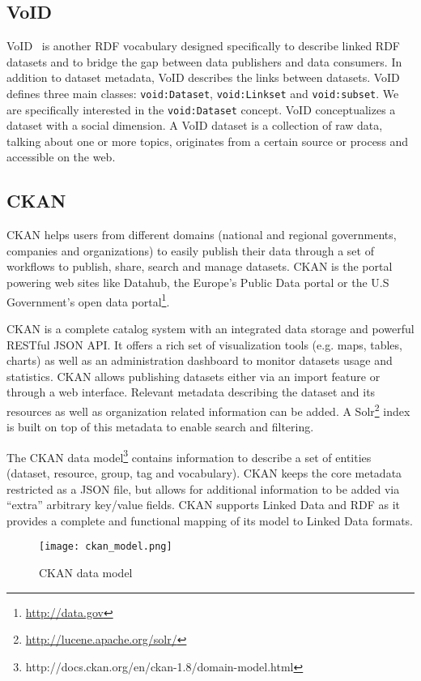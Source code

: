 \subsection{VoID}
VoID~\cite{Bohm:WebSemJournal:11} is another RDF vocabulary designed specifically to describe linked RDF datasets and to bridge the gap between data publishers and data consumers. In addition to dataset metadata, VoID describes the links between datasets. VoID defines three main classes: \texttt{void:Dataset}, \texttt{void:Linkset} and \texttt{void:subset}. We are specifically interested in the \texttt{void:Dataset} concept. VoID conceptualizes a dataset with a social dimension. A VoID dataset is a collection of raw data, talking about one or more topics, originates from a certain source or process and accessible on the web.

\subsection{CKAN}
CKAN helps users from different domains (national and regional governments, companies and organizations) to easily publish their data through a set of workflows to publish, share, search and manage datasets. CKAN is the portal powering web sites like Datahub, the Europe's Public Data portal or the U.S Government's open data portal\footnote{\url{http://data.gov}}.

CKAN is a complete catalog system with an integrated data storage and powerful RESTful JSON API. It offers a rich set of visualization tools (e.g. maps, tables, charts) as well as an administration dashboard to monitor datasets usage and statistics. CKAN allows publishing datasets either via an import feature or through a web interface. Relevant metadata describing the dataset and its resources as well as organization related information can be added. A Solr\footnote{\url{http://lucene.apache.org/solr/}} index is built on top of this metadata to enable search and filtering.

The CKAN data model\footnote{http://docs.ckan.org/en/ckan-1.8/domain-model.html} contains information to describe a set of entities (dataset, resource, group, tag and vocabulary). CKAN keeps the core metadata restricted as a JSON file, but allows for additional information to be added via ``extra'' arbitrary key/value fields. CKAN supports Linked Data and RDF as it provides a complete and functional mapping of its model to Linked Data formats.

\begin{figure}[ht!]
\centering
	\texttt{[image: ckan\_model.png]}
	\caption{CKAN data model}
	\label{fig:ckan_model}
\end{figure}

